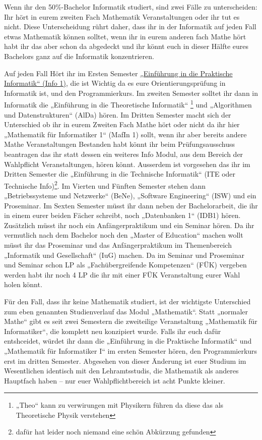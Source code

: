 Wenn ihr den 50\%-Bachelor Informatik studiert, sind zwei Fälle zu
unterscheiden: Ihr hört in eurem zweiten Fach Mathematik Veranstaltungen oder
ihr tut es nicht. Diese Unterscheidung rührt daher, dass ihr in der Informatik
auf jeden Fall etwas Mathematik können solltet, wenn ihr in eurem anderen fach
Mathe hört habt ihr das aber schon da abgedeckt und ihr könnt euch in dieser
Hälfte eures Bachelors ganz auf die Informatik konzentrieren.

Auf jeden Fall Hört ihr im Ersten Semester \hyperref[info1]{„Einführung in die
Praktische Informatik“ (Info 1)}, die ist Wichtig da es eure
Orientierungsprüfung in Informatik ist, und den Programmierkurs.  Im zweiten
Semester solltet ihr dann in Informatik die „Einführung in die Theoretische
Informatik“ \footnote{„Theo“ kann zu verwirungen mit Physikern führen da diese
das als Theoretische Physik verstehen} und „Algorithmen und Datenstrukturen“
(AlDa) hören. Im Dritten Semester macht sich der Unterschied ob ihr in eurem
Zweiten Fach Mathe hört oder nicht da ihr hier „Mathematik für Informatiker 1“
(MafIn 1) sollt, wenn ihr aber bereits andere Mathe Veranstaltungen Bestanden
habt könnt ihr beim Prüfungsausschuss beantragen das ihr statt dessen ein
weiteres Info Modul, aus dem Bereich der Wahlpflicht Veranstaltungen, hören
könnt.  Ausserdem ist vorgesehen das ihr im Dritten Semester die „Einführung in
die Technische Informatik“ (ITE oder Technische Info)\footnote{dafür hat leider
noch niemand eine schön Abkürzung gefunden}.  Im Vierten und Fünften Semester
stehen dann „Betriebssysteme und Netzwerke“ (BeNe), „Software Engineering“
(ISW) und ein Proseminar. Im Sexten Semester müsst ihr dann neben der
Bachelorarbeit, die ihr in einem eurer beiden Fächer schreibt, noch
„Datenbanken 1“ (IDB1) hören.  Zusätzlich müsst ihr noch ein Anfängerpraktikum
und ein Seminar hören.  Da ihr vermutlich nach dem Bachelor noch den „Master of
Education“ machen wollt müsst ihr das Proseminar und das Anfängerpraktikum im
Themenbereich „Informatik und Gesellschaft“ (IuG) machen. Da im Seminar und
Proseminar und Seminar schon LP als „Fachübergreifende Kompetenzen“ (FÜK)
vergeben werden habt ihr noch 4 LP die ihr mit einer FÜK Veranstaltung eurer
Wahl holen könnt.

Für den Fall, dass ihr keine Mathematik studiert, ist der wichtigste
Unterschied zum eben genannten Studienverlauf das Modul „Mathematik“. Statt
„normaler Mathe“ gibt es seit zwei Semestern die zweiteilige Veranstaltung
„Mathematik für Informatiker“, die komplett neu konzipiert wurde. Falls ihr
euch dafür entshceidet, würdet ihr dann die „Einführung in die Praktische
Informatik“ und „Mathematik für Informatiker I“ im ersten Semester hören, den
Programmierkurs erst im dritten Semester. Abgesehen von dieser Änderung ist
euer Studium im Wesentlichen identisch mit den Lehramtsstudis, die Mathematik
als anderes Hauptfach haben -- nur euer Wahlpflichtbereich ist acht Punkte
kleiner.

